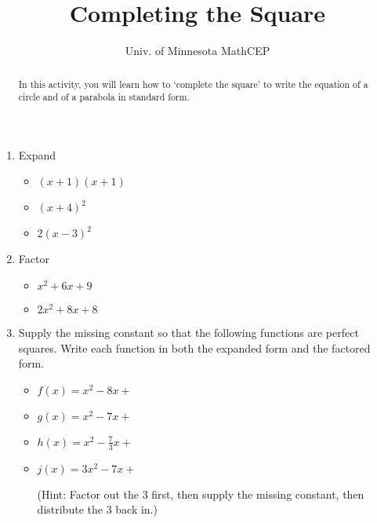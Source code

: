 \documentclass[number]{ximera}
\title{Completing the Square}
\author{Univ. of Minnesota MathCEP}
\begin{document}
\begin{abstract}
  In this activity, you will learn how to `complete the square' to write the equation of a circle and of a parabola in standard form.
\end{abstract}

\maketitle

\begin{enumerate}

\item Expand 

\begin{itemize}

\item $(x+1)(x+1)$

\item $(x+4)^2$

\item $2(x-3)^2$

\end{itemize}

\item Factor

\begin{itemize}

\item $x^2+6x+9$

\item $2x^2+8x+8$

\end{itemize}

\item Supply the missing constant so that the following functions are perfect squares. Write each function in both the expanded form and the factored form.

\begin{itemize}

\item	$f(x) = x^2 - 8x +$

\item $g(x) = x^2 - 7x +$

\item $h(x) = x^2 - \frac{7}{3}x +$

\item $j(x) = 3x^2 - 7x +$ 

(Hint: Factor out the $3$ first, then supply the missing constant, then distribute the $3$ back in.)

\end{itemize}


\end{enumerate}
\end{document}
